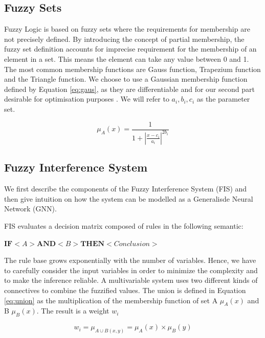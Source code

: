 \subsection{Fuzzy Sets}

Fuzzy Logic is based on fuzzy sets where the requirements for membership are not precisely defined. By introducing the concept of partial membership, the fuzzy set definition accounts for imprecise requirement for the membership of an element in a set. This means the element can take any value between 0 and 1. The most common membership functions are Gauss function, Trapezium function and the Triangle function. We choose to use a Gaussian membership function defined by  Equation \ref{eq:gaus},  as they are differentiable and for our second part desirable for optimisation purposes \cite{wu12}. We will refer to $a_i, b_i, c_i$ as the parameter set. 


\begin{equation} \label{eq:gaus}
\mu_A(x) =  \frac{1}{ 1 + |\frac{x- c_i }{a_i}|^{2b_i}  }\end{equation}


\subsection{Fuzzy Interference System}

We first describe the components of the Fuzzy Interference System (FIS) and then give intuition on how the system can be modelled as a Generalisde Neural Network (GNN). 

FIS evaluates a decision matrix composed of rules in the following semantic: \\

\centerline {$ \textbf{IF} <  A  > \textbf{AND} <  B  > \textbf{THEN} < Conclusion > $}

The rule base grows exponentially with the number of variables. Hence, we have to carefully consider the input variables in order to minimize the complexity and to make the inference reliable. A multivariable system uses two different kinds of connectives to combine the fuzzified values. The union is defined in Equation \ref{eq:union} as the multiplication of the membership function of set A $\mu_A(x)$ and B $\mu_B(x).$ The result is a weight $w_i$


 \begin{equation} \label{eq:union}
 w_i =  \mu_{A\cup B(x,y)} =   \mu_A (x) \times \mu_B(y)
 \end{equation}

